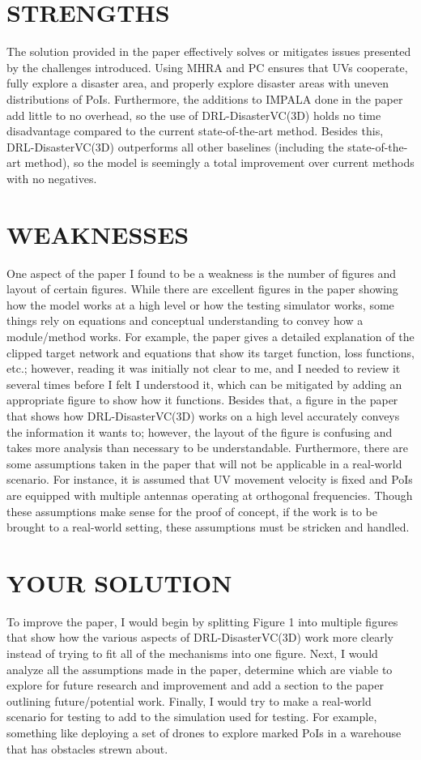\documentclass[sigconf, natbib=false]{acmart}
\begin{document}
   \section{STRENGTHS}
   The solution provided in the paper effectively solves or mitigates issues presented by the challenges introduced. Using MHRA and PC ensures that UVs cooperate, fully explore a disaster area, and properly explore disaster areas with uneven distributions of PoIs. Furthermore, the additions to IMPALA done in the paper add little to no overhead, so the use of DRL-DisasterVC(3D) holds no time disadvantage compared to the current state-of-the-art method. Besides this, DRL-DisasterVC(3D) outperforms all other baselines (including the state-of-the-art method), so the model is seemingly a total improvement over current methods with no negatives.
   
   \section{WEAKNESSES}
   One aspect of the paper I found to be a weakness is the number of figures and layout of certain figures. While there are excellent figures in the paper showing how the model works at a high level or how the testing simulator works, some things rely on equations and conceptual understanding to convey how a module/method works. For example, the paper gives a detailed explanation of the clipped target network and equations that show its target function, loss functions, etc.; however, reading it was initially not clear to me, and I needed to review it several times before I felt I understood it, which can be mitigated by adding an appropriate figure to show how it functions. Besides that, a figure in the paper that shows how DRL-DisasterVC(3D) works on a high level accurately conveys the information it wants to; however, the layout of the figure is confusing and takes more analysis than necessary to be understandable. Furthermore, there are some assumptions taken in the paper that will not be applicable in a real-world scenario. For instance, it is assumed that UV movement velocity is fixed and PoIs are equipped with multiple antennas operating at orthogonal frequencies. Though these assumptions make sense for the proof of concept, if the work is to be brought to a real-world setting, these assumptions must be stricken and handled.
   
   \section{YOUR SOLUTION}
   To improve the paper, I would begin by splitting Figure 1 into multiple figures that show how the various aspects of DRL-DisasterVC(3D) work more clearly instead of trying to fit all of the mechanisms into one figure. Next, I would analyze all the assumptions made in the paper, determine which are viable to explore for future research and improvement and add a section to the paper outlining future/potential work. Finally, I would try to make a real-world scenario for testing to add to the simulation used for testing. For example, something like deploying a set of drones to explore marked PoIs in a warehouse that has obstacles strewn about.
\end{document}
